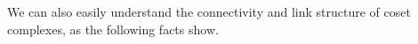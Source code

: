 \documentclass[10pt,a4paper]{article}
\theoremstyle{definition}
\newtheorem{definition}[theorem]{Definition}
\newtheorem{remark}[theorem]{Remark}
\newtheorem{fact}[theorem]{Fact}
\newcommand{\calH}{\mathcal{H}}
\newcommand{\CC}[2]{\mathcal{C}\mathcal{C}(#1;#2)}
\begin{document}
We can also easily understand the connectivity and link structure of coset complexes, as the following facts show.
%
\end{document}
